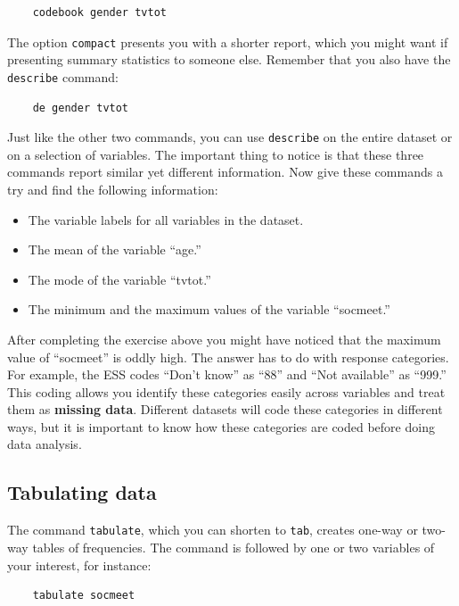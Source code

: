 \documentclass{article}
\begin{document}
\begin{lstlisting}
	codebook gender tvtot
\end{lstlisting}

The option \texttt{compact} presents you with a shorter report, which you might want if presenting summary statistics to someone else. Remember that you also have the \texttt{describe} command:

\begin{lstlisting}
	de gender tvtot
\end{lstlisting}

Just like the other two commands, you can use \texttt{describe} on the entire dataset or on a selection of variables. The important thing to notice is that these three commands report similar yet different information. Now give these commands a try and find the following information:

\begin{itemize}
	\item The variable labels for all variables in the dataset.
	\item The mean of the variable ``age.''
	\item The mode of the variable ``tvtot.''
	\item The minimum and the maximum values of the variable ``socmeet.''
\end{itemize}

After completing the exercise above you might have noticed that the maximum value of ``socmeet'' is oddly high. The answer has to do with response categories. For example, the ESS codes ``Don't know'' as ``88'' and ``Not available'' as ``999.'' This coding allows you identify these categories easily across variables and treat them as \textbf{missing data}. Different datasets will code these categories in different ways, but it is important to know how these categories are coded before doing data analysis.

\subsection*{Tabulating data}

The command \texttt{tabulate}, which you can shorten to \texttt{tab}, creates one-way or two-way tables of frequencies. The command is followed by one or two variables of your interest, for instance:

\begin{lstlisting}
	tabulate socmeet
\end{lstlisting}
\end{document}
